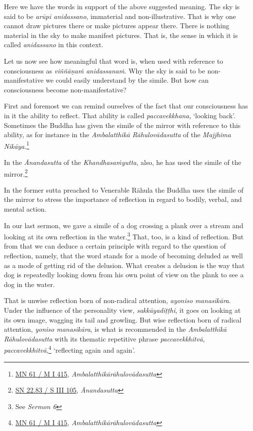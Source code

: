 Here we have the words in support of the above suggested meaning. The sky is said to be \emph{arūpī anidassano}, immaterial and non-illustrative. That is why one cannot draw pictures there or make pictures appear there. There is nothing material in the sky to make manifest pictures. That is, the sense in which it is called \emph{anidassano} in this context.

Let us now see how meaningful that word is, when used with reference to consciousness as \emph{viññāṇaṁ anidassanaṁ}. Why the sky is said to be non-manifestative we could easily understand by the simile. But how can consciousness become non-manifestative?

First and foremost we can remind ourselves of the fact that our consciousness has in it the ability to reflect. That ability is called \emph{paccavekkhana}, `looking back'. Sometimes the Buddha has given the simile of the mirror with reference to this ability, as for instance in the \emph{Ambalatthikā Rāhulovādasutta} of the \emph{Majjhima Nikāya}.\footnote{\href{https://suttacentral.net/mn61/pli/ms}{MN 61 / M I 415}, \emph{Ambalatthikārāhulovādasutta}}

In the \emph{Ānandasutta} of the \emph{Khandhasaṁyutta}, also, he has used the simile of the mirror.\footnote{\href{https://suttacentral.net/sn22.83/pli/ms}{SN 22.83 / S III 105}, \emph{Ānandasutta}}

In the former sutta preached to Venerable Rāhula the Buddha uses the simile of the mirror to stress the importance of reflection in regard to bodily, verbal, and mental action.

In our last sermon, we gave a simile of a dog crossing a plank over a stream and looking at its own reflection in the water.\footnote{See \emph{Sermon 6}} That, too, is a kind of reflection. But from that we can deduce a certain principle with regard to the question of reflection, namely, that the word stands for a mode of becoming deluded as well as a mode of getting rid of the delusion. What creates a delusion is the way that dog is repeatedly looking down from his own point of view on the plank to see a dog in the water.

That is unwise reflection born of non-radical attention, \emph{ayoniso manasikāra}. Under the influence of the personality view, \emph{sakkāyadiṭṭhi}, it goes on looking at its own image, wagging its tail and growling. But wise reflection born of radical attention, \emph{yoniso manasikāra}, is what is recommended in the \emph{Ambalatthikā Rāhulovādasutta} with its thematic repetitive phrase \emph{paccavekkhitvā, paccavekkhitvā},\footnote{\href{https://suttacentral.net/mn61/pli/ms}{MN 61 / M I 415}, \emph{Ambalatthikārāhulovādasutta}} `reflecting again and again'.

